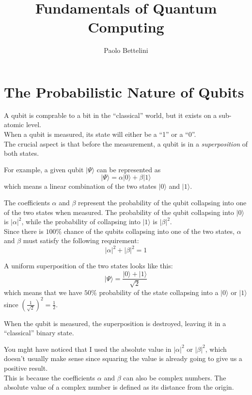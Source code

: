 \documentclass{article}
\title{Fundamentals of Quantum Computing}
\author{Paolo Bettelini}
\date{}
\newcommand{\quotes}[1]{``#1''}
\begin{document}
\maketitle
\tableofcontents
\pagebreak

\section{The Probabilistic Nature of Qubits}

A qubit is comprable to a bit in the \quotes{classical} world, but it exists on a sub-atomic level. \\
When a qubit is measured, its state will either be a \quotes{1} or a \quotes{0}. \\
The crucial aspect is that before the measurement, a qubit is in a \textit{superposition} of both states.

For example, a given qubit \(|\Psi\rangle\) can be represented as
\[
    |\Psi\rangle=\alpha |0\rangle+\beta |1\rangle
\]
which means a linear combination of the two states \(|0\rangle\) and \(|1\rangle\).

The coefficients \(\alpha\) and \(\beta\) represent the probability of the qubit collapsing into one of the two states when measured.
The probability of the qubit collapsing into \(|0\rangle\) is \(|\alpha|^2\),
while the probability of collapsing into \(|1\rangle\) is \(|\beta|^2\). \\
Since there is \(100\%\) chance of the qubits collapsing into one of the two states, \(\alpha\) and \(\beta\) must satisfy the following requirement:
\[
    |\alpha|^2+|\beta|^2=1
\]

A uniform superposition of the two states looks like this:
\[
    |\Psi\rangle=\frac{|0\rangle+|1\rangle}{\sqrt{2}}
\]
which means that we have \(50\%\) probability of the state collapsing into a \(|0\rangle\) or \(|1\rangle\)
since \({\left(\frac{1}{\sqrt{2}}\right)}^2=\frac{1}{2}\).

When the qubit is measured, the superposition is destroyed, leaving it in a \quotes{classical} binary state.

You mght have noticed that I used the absolute value in \(|\alpha|^2\) or \(|\beta|^2\), which doesn't usually make sense since squaring the value is already going to give us a positive result.
\\
This is because the coefficients \(\alpha\) and \(\beta\) can also be complex numbers. The absolute value of a complex number is defined as its distance from the origin.
\end{document}
